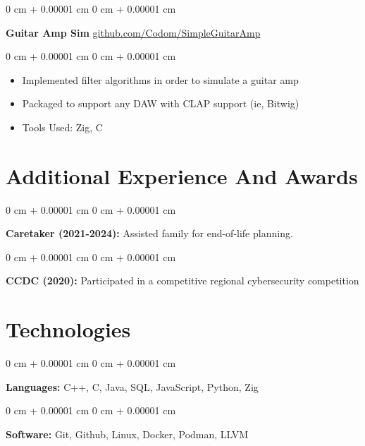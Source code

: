 \documentclass[10pt, letterpaper]{article}
\newenvironment{highlights}{
    \begin{itemize}[
        topsep=0.10 cm,
        parsep=0.10 cm,
        partopsep=0pt,
        itemsep=0pt,
        leftmargin=0 cm + 10pt
    ]
}{
    \end{itemize}
} %
\newenvironment{onecolentry}{
    \begin{adjustwidth}{
        0 cm + 0.00001 cm
    }{
        0 cm + 0.00001 cm
    }
}{
    \end{adjustwidth}
} %
\newenvironment{twocolentry}[2][]{
    \onecolentry
    \def\secondColumn{#2}
    \setcolumnwidth{\fill, 6.0 cm}
    \begin{paracol}{2}
}{
    \switchcolumn \raggedleft \secondColumn
    \end{paracol}
    \endonecolentry
} %
\begin{document}
        \vspace{0.2 cm}

        \begin{twocolentry}{
            \href{https://github.com/Codom/SimpleGuitarAmp}{github.com/Codom/SimpleGuitarAmp}
        }
            \textbf{Guitar Amp Sim}\end{twocolentry}

        \vspace{0.10 cm}
        \begin{onecolentry}
            \begin{highlights}
                \item Implemented filter algorithms in order to simulate a guitar amp
                \item Packaged to support any DAW with CLAP support (ie, Bitwig)
                \item Tools Used: Zig, C
            \end{highlights}
        \end{onecolentry}

    \section{Additional Experience And Awards}

        \begin{onecolentry}
            \textbf{Caretaker (2021-2024):} Assisted family for end-of-life planning.
        \end{onecolentry}

        \vspace{0.2 cm}

        \begin{onecolentry}
            \textbf{CCDC (2020):} Participated in a competitive regional cybersecurity competition
        \end{onecolentry}

    \section{Technologies}
        \begin{onecolentry}
            \textbf{Languages:} C++, C, Java, SQL, JavaScript, Python, Zig
        \end{onecolentry}

        \vspace{0.2 cm}

        \begin{onecolentry}
            \textbf{Software:} Git, Github, Linux, Docker, Podman, LLVM
        \end{onecolentry}
\end{document}
